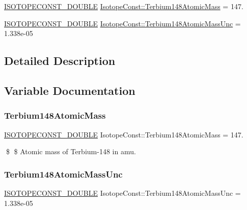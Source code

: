 \begin{DoxyCompactItemize}
\item 
\mbox{\hyperlink{group___isotope_const-_macros_ga8f45a7272ce02c0b4c65c44636ed719a}{I\+S\+O\+T\+O\+P\+E\+C\+O\+N\+S\+T\+\_\+\+D\+O\+U\+B\+LE}} \mbox{\hyperlink{group___isotope_const-_terbium-_tb148_ga30c40a16ae690de58d91de34cdfe4645}{Isotope\+Const\+::\+Terbium148\+Atomic\+Mass}} = 147.
\item 
\mbox{\hyperlink{group___isotope_const-_macros_ga8f45a7272ce02c0b4c65c44636ed719a}{I\+S\+O\+T\+O\+P\+E\+C\+O\+N\+S\+T\+\_\+\+D\+O\+U\+B\+LE}} \mbox{\hyperlink{group___isotope_const-_terbium-_tb148_ga8f03e052d4c512c8461f61ab3f4299a0}{Isotope\+Const\+::\+Terbium148\+Atomic\+Mass\+Unc}} = 1.\+338e-\/05
\end{DoxyCompactItemize}


\subsection{Detailed Description}


\subsection{Variable Documentation}
\mbox{\label{group___isotope_const-_terbium-_tb148_ga30c40a16ae690de58d91de34cdfe4645}} 
\subsubsection{\texorpdfstring{Terbium148\+Atomic\+Mass}{Terbium148AtomicMass}}
{\footnotesize\ttfamily \mbox{\hyperlink{group___isotope_const-_macros_ga8f45a7272ce02c0b4c65c44636ed719a}{I\+S\+O\+T\+O\+P\+E\+C\+O\+N\+S\+T\+\_\+\+D\+O\+U\+B\+LE}} Isotope\+Const\+::\+Terbium148\+Atomic\+Mass = 147.}

\$ \$ Atomic mass of Terbium-\/148 in amu. \mbox{\label{group___isotope_const-_terbium-_tb148_ga8f03e052d4c512c8461f61ab3f4299a0}} 
\subsubsection{\texorpdfstring{Terbium148\+Atomic\+Mass\+Unc}{Terbium148AtomicMassUnc}}
{\footnotesize\ttfamily \mbox{\hyperlink{group___isotope_const-_macros_ga8f45a7272ce02c0b4c65c44636ed719a}{I\+S\+O\+T\+O\+P\+E\+C\+O\+N\+S\+T\+\_\+\+D\+O\+U\+B\+LE}} Isotope\+Const\+::\+Terbium148\+Atomic\+Mass\+Unc = 1.\+338e-\/05}

